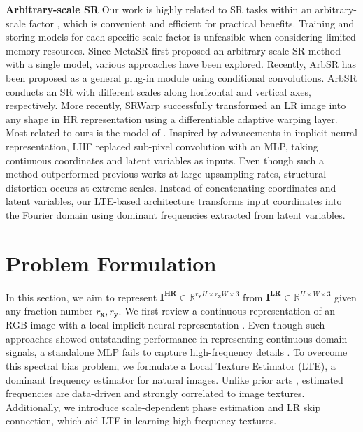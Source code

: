 \documentclass[10pt,twocolumn,letterpaper]{article}
\begin{document}
{\bf Arbitrary-scale SR} Our work is highly related to SR tasks within an arbitrary-scale factor \cite{hu2019meta, SRWarp, Wang2020Learning, chen2021learning}, which is convenient and efficient for practical benefits. Training and storing models for each specific scale factor \cite{DBLP:journals/corr/ShiCHTABRW16, Lim_2017_CVPR_Workshops, zhang2018residual, zhang2018rcan, DBLP:conf/cvpr/Chen000DLMX0021, liang2021swinir} is unfeasible when considering limited memory resources. Since MetaSR \cite{hu2019meta} first proposed an arbitrary-scale SR method with a single model, various approaches have been explored. Recently, ArbSR \cite{Wang2020Learning} has been proposed as a general plug-in module using conditional convolutions. ArbSR conducts an SR with different scales along horizontal and vertical axes, respectively. More recently, SRWarp \cite{SRWarp} successfully transformed an LR image into any shape in HR representation using a differentiable adaptive warping layer. Most related to ours is the model of \cite{chen2021learning}. Inspired by advancements in implicit neural representation, LIIF replaced sub-pixel convolution with an MLP, taking continuous coordinates and latent variables as inputs. Even though such a method outperformed previous works at large upsampling rates, structural distortion occurs at extreme scales. Instead of concatenating coordinates and latent variables, our LTE-based architecture transforms input coordinates into the Fourier domain using dominant frequencies extracted from latent variables.

\section{Problem Formulation}

























In this section, we aim to represent $\mathbf{I^{HR}}\in \mathbb{R}^{r_{\mathbf y}H\times r_{\mathbf x}W\times3}$ from $\mathbf{I^{LR}}\in \mathbb{R}^{H\times W\times3}$ given any fraction number $r_{\mathbf x}, r_{\mathbf y}$. We first review a continuous representation of an RGB image with a local implicit neural representation \cite{Local_Implicit_Grid_CVPR20, chen2021learning}. Even though such approaches showed outstanding performance in representing continuous-domain signals, a standalone MLP fails to capture high-frequency details \cite{DBLP:conf/icml/RahamanBADLHBC19}. To overcome this spectral bias problem, we formulate a Local Texture Estimator (LTE), a dominant frequency estimator for natural images. Unlike prior arts \cite{mildenhall2020nerf, tancik2020fourfeat}, estimated frequencies are data-driven and strongly correlated to image textures. Additionally, we introduce scale-dependent phase estimation and LR skip connection, which aid LTE in learning high-frequency textures.
\end{document}
